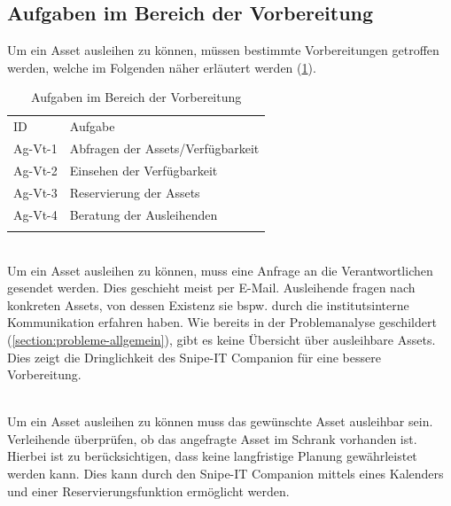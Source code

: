 \subsection{Aufgaben im Bereich der Vorbereitung}
Um ein Asset ausleihen zu können, müssen bestimmte Vorbereitungen getroffen
werden, welche im Folgenden näher erläutert werden (\ref{table:Ag-Vt}).

\begin{table}[h]
        \centering
        \caption{Aufgaben im Bereich der Vorbereitung}
        \begin{tabular}{ll}
                \arrayrulecolor{maincolor}\hline
                \sffamily\color{maincolor}ID & \sffamily\color{maincolor}Aufgabe
                \\
                \arrayrulecolor{maincolor}\hline
                Ag-Vt-1                      & Abfragen der Assets/Verfügbarkeit
                \\
                Ag-Vt-2                      & Einsehen der Verfügbarkeit
                \\
                Ag-Vt-3                      & Reservierung der Assets
                \\
                Ag-Vt-4                      & Beratung der Ausleihenden
                \\
                \arrayrulecolor{maincolor}\hline
        \end{tabular}
        \label{table:Ag-Vt}
\end{table}

{\sffamily\color{maincolor}{Ag-Vt-1 | Abfragen der Assets/Verfügbarkeit}}\\
Um ein Asset ausleihen zu können, muss eine Anfrage an die Verantwortlichen
gesendet werden. Dies geschieht meist per E-Mail. Ausleihende fragen nach
konkreten Assets, von dessen Existenz sie bspw. durch die institutsinterne
Kommunikation erfahren haben. Wie bereits in der Problemanalyse geschildert
(\ref{section:probleme-allgemein}), gibt es keine Übersicht über ausleihbare
Assets. Dies zeigt die Dringlichkeit des Snipe-IT Companion für eine bessere
Vorbereitung.

        {\sffamily\color{maincolor}{Ag-Vt-2 | Einsehen der Verfügbarkeit}}\\
Um ein Asset ausleihen zu können muss das gewünschte Asset ausleihbar sein.
Verleihende überprüfen, ob das angefragte Asset im Schrank vorhanden ist.
Hierbei ist zu berücksichtigen, dass keine langfristige Planung gewährleistet
werden kann. Dies kann durch den Snipe-IT Companion mittels eines Kalenders und
einer Reservierungsfunktion ermöglicht werden.

